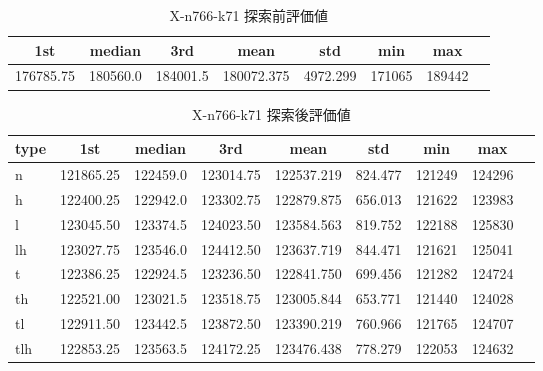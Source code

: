 \begin{table}[htbp]
    \caption{X-n766-k71 探索前評価値}
    \begin{tabular}{|l|l|l|l|l|l|l|l|}\hline
    \multicolumn{1}{|c|}{\textbf{1st}}
    &\multicolumn{1}{c|}{\textbf{median}}
    &\multicolumn{1}{c|}{\textbf{3rd}}
    &\multicolumn{1}{c|}{\textbf{mean}}
    &\multicolumn{1}{c|}{\textbf{std}}
    &\multicolumn{1}{c|}{\textbf{min}}
    &\multicolumn{1}{c|}{\textbf{max}}\\\hline
	176785.75 & 180560.0 & 184001.5 & 180072.375 & 4972.299 & 171065 & 189442\\\hline
	\end{tabular}
\end{table}
\begin{table}[htbp]
    \caption{X-n766-k71 探索後評価値}
    \begin{tabular}{|l|l|l|l|l|l|l|l|l|}\hline
    \multicolumn{1}{|c|}{\textbf{type}}
    &\multicolumn{1}{|c|}{\textbf{1st}}
    &\multicolumn{1}{c|}{\textbf{median}}
    &\multicolumn{1}{c|}{\textbf{3rd}}
    &\multicolumn{1}{c|}{\textbf{mean}}
    &\multicolumn{1}{c|}{\textbf{std}}
    &\multicolumn{1}{c|}{\textbf{min}}
    &\multicolumn{1}{c|}{\textbf{max}}\\\hline
	n & 121865.25 & 122459.0 & 123014.75 & 122537.219 & 824.477 & 121249 & 124296\\\hline
	h & 122400.25 & 122942.0 & 123302.75 & 122879.875 & 656.013 & 121622 & 123983\\\hline
	l & 123045.50 & 123374.5 & 124023.50 & 123584.563 & 819.752 & 122188 & 125830\\\hline
	lh & 123027.75 & 123546.0 & 124412.50 & 123637.719 & 844.471 & 121621 & 125041\\\hline
	t & 122386.25 & 122924.5 & 123236.50 & 122841.750 & 699.456 & 121282 & 124724\\\hline
	th & 122521.00 & 123021.5 & 123518.75 & 123005.844 & 653.771 & 121440 & 124028\\\hline
	tl & 122911.50 & 123442.5 & 123872.50 & 123390.219 & 760.966 & 121765 & 124707\\\hline
	tlh & 122853.25 & 123563.5 & 124172.25 & 123476.438 & 778.279 & 122053 & 124632\\\hline
	\end{tabular}
\end{table}
